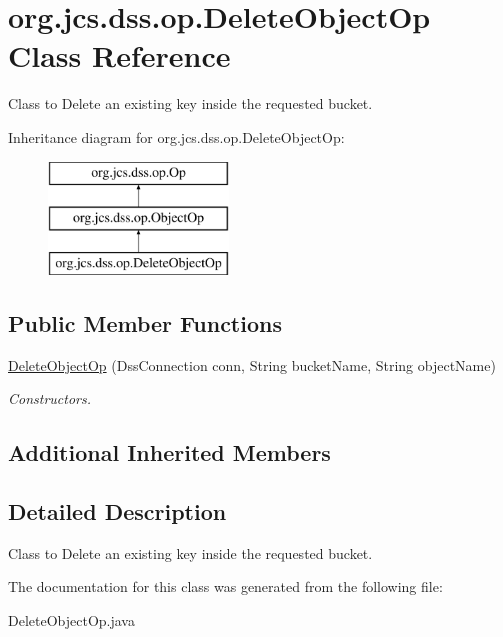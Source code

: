 \hypertarget{classorg_1_1jcs_1_1dss_1_1op_1_1DeleteObjectOp}{}\section{org.\+jcs.\+dss.\+op.\+Delete\+Object\+Op Class Reference}
\label{classorg_1_1jcs_1_1dss_1_1op_1_1DeleteObjectOp}


Class to Delete an existing key inside the requested bucket.  


Inheritance diagram for org.\+jcs.\+dss.\+op.\+Delete\+Object\+Op\+:\begin{figure}[H]
\begin{center}
\leavevmode
\includegraphics[height=3.000000cm]{classorg_1_1jcs_1_1dss_1_1op_1_1DeleteObjectOp}
\end{center}
\end{figure}
\subsection*{Public Member Functions}
\begin{DoxyCompactItemize}
\item 
\hyperlink{classorg_1_1jcs_1_1dss_1_1op_1_1DeleteObjectOp_a4971df5680e8bcd19bb577227c1bf37a}{Delete\+Object\+Op} (Dss\+Connection conn, String bucket\+Name, String object\+Name)\hypertarget{classorg_1_1jcs_1_1dss_1_1op_1_1DeleteObjectOp_a4971df5680e8bcd19bb577227c1bf37a}{}\label{classorg_1_1jcs_1_1dss_1_1op_1_1DeleteObjectOp_a4971df5680e8bcd19bb577227c1bf37a}

\begin{DoxyCompactList}\small\item\em Constructors. \end{DoxyCompactList}\end{DoxyCompactItemize}
\subsection*{Additional Inherited Members}


\subsection{Detailed Description}
Class to Delete an existing key inside the requested bucket. 

The documentation for this class was generated from the following file\+:\begin{DoxyCompactItemize}
\item 
Delete\+Object\+Op.\+java\end{DoxyCompactItemize}
